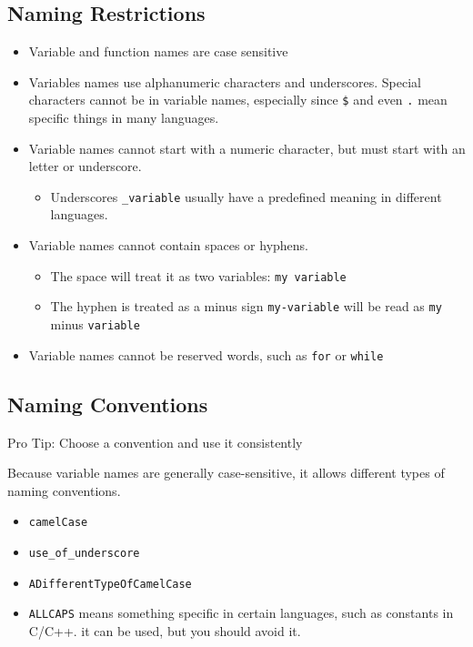 \documentclass[
]{book}
\providecommand{\tightlist}{%
  \setlength{\itemsep}{0pt}\setlength{\parskip}{0pt}}
\begin{document}
\subsection{Naming Restrictions}\label{naming-restrictions}

\begin{itemize}
\tightlist
\item
  Variable and function names are case sensitive
\item
  Variables names use alphanumeric characters and underscores. Special characters cannot be in variable names, especially since \texttt{\$} and even \texttt{.} mean specific things in many languages.\\
\item
  Variable names cannot start with a numeric character, but must start with an letter or underscore.

  \begin{itemize}
  \tightlist
  \item
    Underscores \texttt{\_variable} usually have a predefined meaning in different languages.
  \end{itemize}
\item
  Variable names cannot contain spaces or hyphens.

  \begin{itemize}
  \tightlist
  \item
    The space will treat it as two variables: \texttt{my\ variable}
  \item
    The hyphen is treated as a minus sign \texttt{my-variable} will be read as \texttt{my} minus \texttt{variable}
  \end{itemize}
\item
  Variable names cannot be reserved words, such as \texttt{for} or \texttt{while}
\end{itemize}

\subsection{Naming Conventions}\label{naming-conventions}

Pro Tip: Choose a convention and use it consistently

Because variable names are generally case-sensitive, it allows different types of naming
conventions.

\begin{itemize}
\tightlist
\item
  \texttt{camelCase}
\item
  \texttt{use\_of\_underscore}
\item
  \texttt{ADifferentTypeOfCamelCase}
\item
  \texttt{ALLCAPS} means something specific in certain languages, such as constants in C/C++. it can be used, but you should avoid it.
\end{itemize}
\end{document}
